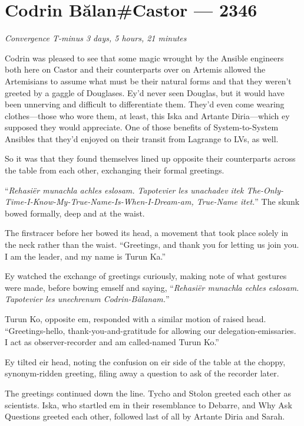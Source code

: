 \hypertarget{codrin-bux103lancastor-2346}{%
\chapter{Codrin Bălan\#Castor — 2346}}

\begin{center}
\emph{Convergence T-minus 3 days, 5 hours, 21 minutes}
\end{center}

\noindent Codrin was pleased to see that some magic wrought by the Ansible engineers both here on Castor and their counterparts over on Artemis allowed the Artemisians to assume what must be their natural forms and that they weren't greeted by a gaggle of Douglases. Ey'd never seen Douglas, but it would have been unnerving and difficult to differentiate them. They'd even come wearing clothes—those who wore them, at least, this Iska and Artante Diria—which ey supposed they would appreciate. One of those benefits of System-to-System Ansibles that they'd enjoyed on their transit from Lagrange to LVs, as well.

So it was that they found themselves lined up opposite their counterparts across the table from each other, exchanging their formal greetings.

``\emph{Rehasiër munachla achles eslosam. Tapotevier les unachadev itek The-Only-Time-I-Know-My-True-Name-Is-When-I-Dream-am, True-Name itet.}'' The skunk bowed formally, deep and at the waist.

The firstracer before her bowed its head, a movement that took place solely in the neck rather than the waist. ``Greetings, and thank you for letting us join you. I am the leader, and my name is Turun Ka.''

Ey watched the exchange of greetings curiously, making note of what gestures were made, before bowing emself and saying, ``\emph{Rehasiër munachla echles eslosam. Tapotevier les unechrenum Codrin-Bălanam.}''

Turun Ko, opposite em, responded with a similar motion of raised head. ``Greetings-hello, thank-you-and-gratitude for allowing our delegation-emissaries. I act as observer-recorder and am called-named Turun Ko.''

Ey tilted eir head, noting the confusion on eir side of the table at the choppy, synonym-ridden greeting, filing away a question to ask of the recorder later.

The greetings continued down the line. Tycho and Stolon greeted each other as scientists. Iska, who startled em in their resemblance to Debarre, and Why Ask Questions greeted each other, followed last of all by Artante Diria and Sarah.

